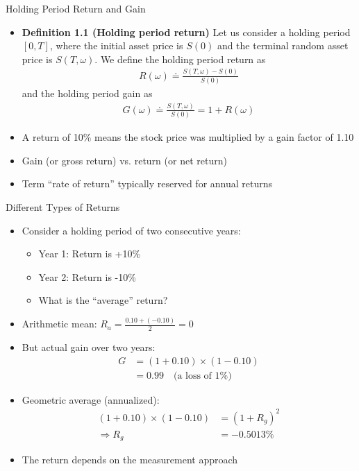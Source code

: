 \documentclass[10pt]{beamer}
\begin{document}
\begin{frame}{Holding Period Return and Gain}
  \begin{itemize}[<+->]
    \item \textbf{Definition 1.1 (Holding period return)} Let us consider a holding period $[0, T]$, where the initial asset price is $S(0)$ and the terminal random asset price is $S(T, \omega)$. We define the holding period return as
    \begin{align*}
      R(\omega) \doteq \tfrac{S(T, \omega) - S(0)}{S(0)}
    \end{align*}
    and the holding period gain as
    \begin{align*}
      G(\omega) \doteq \tfrac{S(T, \omega)}{S(0)} = 1 + R(\omega)
    \end{align*}
    \item A return of 10\% means the stock price was multiplied by a gain factor of 1.10
    \item Gain (or gross return) vs. return (or net return)
    \item Term ``rate of return'' typically reserved for annual returns
  \end{itemize}
\end{frame}

\begin{frame}{Different Types of Returns}
  \begin{itemize}[<+->]
    \item Consider a holding period of two consecutive years:
    \begin{itemize}
      \item Year 1: Return is +10\%
      \item Year 2: Return is -10\%
      \item What is the ``average'' return?
    \end{itemize}
    \item Arithmetic mean: $R_a = \tfrac{0.10 + (-0.10)}{2} = 0$
    \item But actual gain over two years:
    \begin{align*}
      G &= (1 + 0.10) \times (1 - 0.10) \\
      &= 0.99 \quad \text{(a loss of 1\%)}
    \end{align*}
    \item Geometric average (annualized): 
    \begin{align*}
      (1 + 0.10) \times (1 - 0.10) &= (1 + R_g)^2 \\
      \Rightarrow R_g &= -0.5013\%
    \end{align*}
    \item The return depends on the measurement approach
  \end{itemize}
\end{frame}
\end{document}
